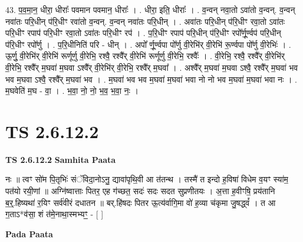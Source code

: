 \documentclass[17pt]{extarticle}
\begin{document}
43. प॒व॒मा॒न॒ धीरा॒ धीराः᳚ पवमान पवमान॒ धीराः᳚ । . धीरा॒ इति॒ धीराः᳚ । . व॒न्वन् नवा॒तो ऽवा॑तो व॒न्वन्. व॒न्वन् नवा॑तः परि॒धीन् प॑रि॒धीꣳ रवा॑तो व॒न्वन्. व॒न्वन् नवा॑तः परि॒धीन् । . अवा॑तः परि॒धीन् प॑रि॒धीꣳ रवा॒तो ऽवा॑तः परि॒धीꣳ रपाप॑ परि॒धीꣳ रवा॒तो ऽवा॑तः परि॒धीꣳ रप॑ । . प॒रि॒धीꣳ रपाप॑ परि॒धीन् प॑रि॒धीꣳ रपो᳚र्णू॒र्ण्वप॑ परि॒धीन् प॑रि॒धीꣳ रपो᳚र्णु । . प॒रि॒धीनिति॑ परि - धीन् । . अपो᳚ र्णू॒र्ण्वपा पो᳚र्णु वी॒रेभि॑र् वी॒रेभि॑ रू॒र्ण्वपा पो᳚र्णु वी॒रेभिः॑ । . ऊ॒र्णु॒ वी॒रेभि॑र् वी॒रेभि॑ रूर्णूर्णु वी॒रेभि॒ रश्वै॒ रश्वै᳚र् वी॒रेभि॑ रूर्णूर्णु वी॒रेभि॒ रश्वैः᳚ । . वी॒रेभि॒ रश्वै॒ रश्वै᳚र् वी॒रेभि॑र् वी॒रेभि॒ रश्वै᳚र् म॒घवा॑ म॒घवा ऽश्वै᳚र् वी॒रेभि॑र् वी॒रेभि॒ रश्वै᳚र् म॒घवा᳚ । . अश्वै᳚र् म॒घवा॑ म॒घवा ऽश्वै॒ रश्वै᳚र् म॒घवा॑ भव भव म॒घवा ऽश्वै॒ रश्वै᳚र् म॒घवा॑ भव । . म॒घवा॑ भव भव म॒घवा॑ म॒घवा॑ भवा नो नो भव म॒घवा॑ म॒घवा॑ भवा नः । . म॒घवेति॑ म॒घ - वा॒ । . भ॒वा॒ नो॒ नो॒ भ॒व॒ भ॒वा॒ नः॒ । \newline
\pagebreak
{}
\section*{ TS 2.6.12.2 }

\textbf{TS 2.6.12.2 } \newline
\textbf{Samhita Paata} \newline

नः ॥ त्वꣳ सो॑म पि॒तृभिः॑ संॅविदा॒नोऽनु॒ द्यावा॑पृथि॒वी आ त॑तन्थ । तस्मै॑ त इन्दो ह॒विषा॑ विधेम व॒यꣳ स्या॑म॒ पत॑यो रयी॒णां ॥ अग्नि॑ष्वात्ताः पितर॒ एह ग॑च्छत॒ सदः॑ सदः सदत सुप्रणीतयः । अ॒त्ता ह॒वीꣳषि॒ प्रय॑तानि ब॒र्॒.हिष्यथा॑ र॒यिꣳ सर्व॑वीरं दधातन ॥ बर्.हि॑षदः पितर ऊ॒त्य॑र्वागि॒मा वो॑ ह॒व्या च॑कृमा जु॒षद्ध्वं᳚ । त आ ग॒ताऽ*व॑सा॒ शं त॑मे॒नाथा॒स्मभ्यꣳ॒॒ - [  ] \newline

\textbf{Pada Paata} \newline
\end{document}
